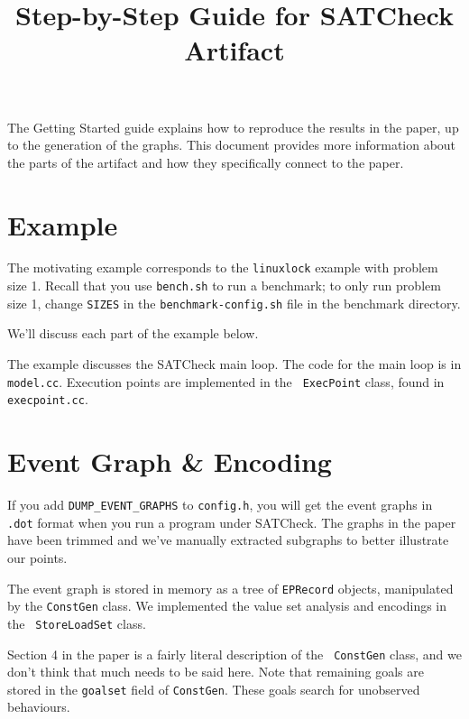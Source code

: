 \documentclass[10pt,nocopyrightspace,preprint]{sigplanconf}
\begin{document}
\copyrightdata{[to be supplied]} 

\sloppy

\title{Step-by-Step Guide for SATCheck Artifact}

\maketitle

The Getting Started guide explains how to reproduce the results in the
paper, up to the generation of the graphs. This document provides more
information about the parts of the artifact and how they specifically
connect to the paper.

\section{Example}
The motivating example corresponds to the {\tt linuxlock} example with
problem size 1. Recall that you use {\tt bench.sh} to run a benchmark;
to only run problem size 1, change {\tt SIZES} in the {\tt benchmark-config.sh} file
in the benchmark directory.

We'll discuss each part of the example below.

The example discusses the SATCheck main loop. The code for the main loop is in
{\tt model.cc}. Execution points are implemented in the {\tt
  ExecPoint} class, found in {\tt execpoint.cc}.

\section{Event Graph \& Encoding}
If you add {\tt DUMP\_EVENT\_GRAPHS} to {\tt config.h}, you will get
the event graphs in {\tt .dot} format when you run a program under
SATCheck. The graphs in the paper have been trimmed and we've manually
extracted subgraphs to better illustrate our points.

The event graph is stored in memory as a tree
of {\tt EPRecord} objects, manipulated by the {\tt ConstGen} class. 
We implemented the value set analysis and encodings in the {\tt
  StoreLoadSet} class.

Section 4 in the paper is a fairly literal description of the {\tt
  ConstGen} class, and we don't think that much needs to be said here.
Note that remaining goals are stored in the {\tt goalset} field of
{\tt ConstGen}. These goals search for unobserved behaviours.
\end{document}
